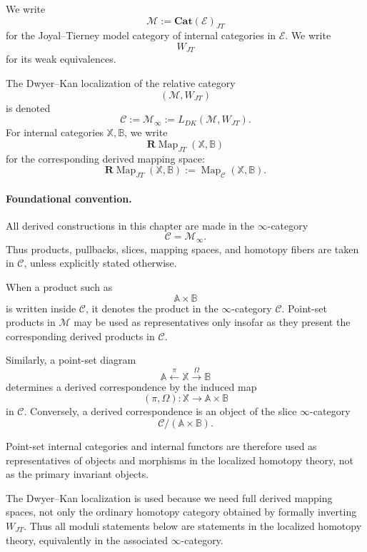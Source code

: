 \begin{definition}
\label{def:jt-model-category-notation-derived}
We write
\[
\mathcal M
:=
\mathbf{Cat}(\mathcal E)_{JT}
\]
for the Joyal--Tierney model category of internal categories in
\(\mathcal E\). We write
\[
W_{JT}
\]
for its weak equivalences.

The Dwyer--Kan localization of the relative category
\[
(\mathcal M,W_{JT})
\]
is denoted
\[
\mathcal C
:=
\mathcal M_\infty
:=
L_{DK}(\mathcal M,W_{JT}).
\]
For internal categories \(\mathbb X,\mathbb B\), we write
\[
\mathbf R\!\operatorname{Map}_{JT}(\mathbb X,\mathbb B)
\]
for the corresponding derived mapping space:
\[
\mathbf R\!\operatorname{Map}_{JT}(\mathbb X,\mathbb B)
:=
\operatorname{Map}_{\mathcal C}(\mathbb X,\mathbb B).
\]
\end{definition}

\paragraph{Foundational convention.}
All derived constructions in this chapter are made in the
\(\infty\)-category
\[
\mathcal C=\mathcal M_\infty.
\]
Thus products, pullbacks, slices, mapping spaces, and homotopy fibers are
taken in \(\mathcal C\), unless explicitly stated otherwise.

When a product such as
\[
\mathbb A\times\mathbb B
\]
is written inside \(\mathcal C\), it denotes the product in the
\(\infty\)-category \(\mathcal C\). Point-set products in
\(\mathcal M\) may be used as representatives only insofar as they
present the corresponding derived products in \(\mathcal C\).

Similarly, a point-set diagram
\[
\mathbb A
\xleftarrow{\pi}
\mathbb X
\xrightarrow{\Omega}
\mathbb B
\]
determines a derived correspondence by the induced map
\[
(\pi,\Omega):\mathbb X\to \mathbb A\times\mathbb B
\]
in \(\mathcal C\). Conversely, a derived correspondence is an object of
the slice \(\infty\)-category
\[
\mathcal C/(\mathbb A\times\mathbb B).
\]

Point-set internal categories and internal functors are therefore used as
representatives of objects and morphisms in the localized homotopy
theory, not as the primary invariant objects.

\begin{remark}
\label{rem:dk-not-only-homotopy-category-derived}
The Dwyer--Kan localization is used because we need full derived mapping
spaces, not only the ordinary homotopy category obtained by formally
inverting \(W_{JT}\). Thus all moduli statements below are statements in
the localized homotopy theory, equivalently in the associated
\(\infty\)-category.
\end{remark}

